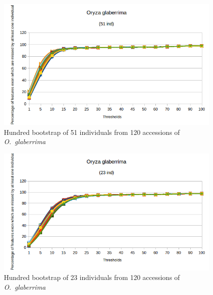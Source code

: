 \documentclass[10pt,letterpaper]{article}
\begin{document}
\begin{figure}
\centering
 \includegraphics[scale=0.7]{determinationSeuilBootstrapGlabExF_verif51.png}
 \caption{Hundred bootstrap of 51 individuals from 120 accessions of \emph{O.~glaberrima}}
 \label{BGLAB51}
\end{figure}

\begin{figure}
\centering
 \includegraphics[scale=0.7]{determinationSeuilBootstrapGlabExF_verif23.png}
 \caption{Hundred bootstrap of 23 individuals from 120 accessions of \emph{O.~glaberrima}}
 \label{BootstrapGLAB23}
\end{figure}
\end{document}
